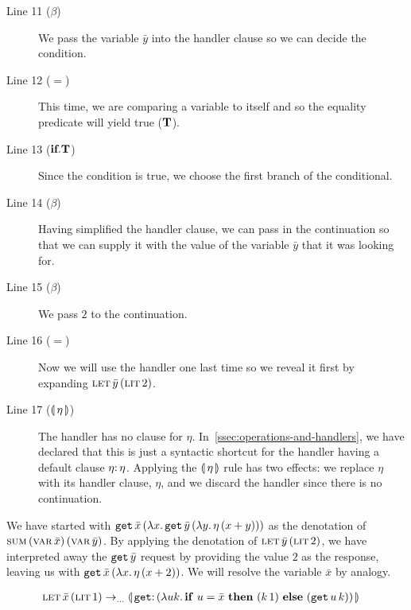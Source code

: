 \begin{description}
  \item[Line 11 ($\beta$)] We pass the variable $\bar{y}$ into the
    handler clause so we can decide the condition.

  \item[Line 12 ($=$)] This time, we are comparing a variable to itself and
    so the equality predicate will yield true ($\textbf{T}$).

  \item[Line 13 ($\textbf{if}.\textbf{T}$)] Since the condition is true, we
    choose the first branch of the conditional.

  \item[Line 14 ($\beta$)] Having simplified the handler clause, we can
    pass in the continuation so that we can supply it with the value of the
    variable $\bar{y}$ that it was looking for.

  \item[Line 15 ($\beta$)] We pass $2$ to the continuation.

  \item[Line 16 ($=$)] Now we will use the handler one last time so we
    reveal it first by expanding $\textsc{let}\,\bar{y}\,(\textsc{lit}\,2)$.

  \item[Line 17 ($\llparenthesis \, \eta \, \rrparenthesis$)] The handler has no clause for
    $\eta$. In~\ref{ssec:operations-and-handlers}, we have declared that
    this is just a syntactic shortcut for the handler having a default
    clause $\onto{\eta}{\eta}$. Applying the $\llparenthesis \, \eta \, \rrparenthesis$ rule has two
    effects: we replace $\eta$ with its handler clause, $\eta$, and we
    discard the handler since there is no continuation.
\end{description}

We have started with $\mathtt{get}\,\bar{x}\,(\lambda x.\, \mathtt{get}\,\bar{y}\,(\lambda y.\, \eta\,(x + y)))$ as the
denotation of $\textsc{sum}\,(\textsc{var}\,\bar{x})\,(\textsc{var}\,\bar{y})$. By applying the denotation
of $\textsc{let}\,\bar{y}\,(\textsc{lit}\,2)$, we have interpreted away the
$\mathtt{get}\,\bar{y}$ request by providing the value $2$ as the
response, leaving us with $\mathtt{get}\,\bar{x}\,(\lambda x.\, \eta\,(x +
      2))$. We will resolve the variable $\bar{x}$ by analogy.

\begin{align*}
  \app{\lete}{\bar{x}}{\litec{1}}
&\to_{\ldots} \banana{\onto{\op{get}}{(\lam{u k}{\ifte{u = \bar{x}}{(\ap{k}{1})}{(\app{\op{get}}{u}{k})}})}}
\end{align*}

